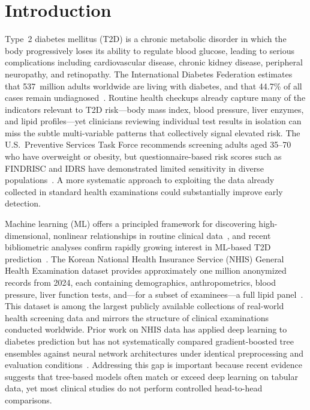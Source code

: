 \section{Introduction}
\label{sec:introduction}

Type~2 diabetes mellitus (T2D) is a chronic metabolic disorder in which the body progressively loses its ability to regulate blood glucose, leading to serious complications including cardiovascular disease, chronic kidney disease, peripheral neuropathy, and retinopathy. The International Diabetes Federation estimates that 537~million adults worldwide are living with diabetes, and that 44.7\% of all cases remain undiagnosed~\cite{Sun2022idf, IDF2021news}. Routine health checkups already capture many of the indicators relevant to T2D risk---body mass index, blood pressure, liver enzymes, and lipid profiles---yet clinicians reviewing individual test results in isolation can miss the subtle multi-variable patterns that collectively signal elevated risk. The U.S.\ Preventive Services Task Force recommends screening adults aged 35--70 who have overweight or obesity, but questionnaire-based risk scores such as FINDRISC and IDRS have demonstrated limited sensitivity in diverse populations~\cite{USPSTF2021screening, Doddamani2021comparative}. A more systematic approach to exploiting the data already collected in standard health examinations could substantially improve early detection.

Machine learning (ML) offers a principled framework for discovering high-dimensional, nonlinear relationships in routine clinical data~\cite{Rajkomar2019ml}, and recent bibliometric analyses confirm rapidly growing interest in ML-based T2D prediction~\cite{Kiran2025bibliometric}. The Korean National Health Insurance Service (NHIS) General Health Examination dataset provides approximately one million anonymized records from 2024, each containing demographics, anthropometrics, blood pressure, liver function tests, and---for a subset of examinees---a full lipid panel~\cite{NHIS2025dataset, Lim2025nhis}. This dataset is among the largest publicly available collections of real-world health screening data and mirrors the structure of clinical examinations conducted worldwide. Prior work on NHIS data has applied deep learning to diabetes prediction but has not systematically compared gradient-boosted tree ensembles against neural network architectures under identical preprocessing and evaluation conditions~\cite{Rhee2021deeplearning}. Addressing this gap is important because recent evidence suggests that tree-based models often match or exceed deep learning on tabular data, yet most clinical studies do not perform controlled head-to-head comparisons.

